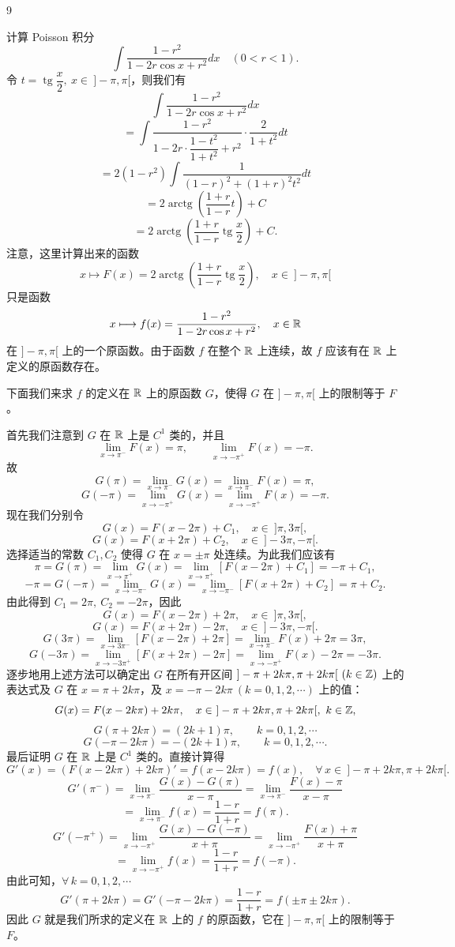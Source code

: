 \begin{sourceexample}{9}

	计算 Poisson 积分
	\[
	\int\frac{1-r^2}{1-2r\cos x+r^2}dx\quad(0<r<1).
	\]
	令 \(t=\operatorname{tg}\dfrac x2,\ x\in\ ]-\pi,\pi[\)，则我们有
	\[
	\int\frac{1-r^2}{1-2r\cos x+r^2}dx
	\]
	\[
	=\int\frac{1-r^2}{1-2r\cdot\dfrac{1-t^2}{1+t^2}+r^2}\cdot\frac2{1+t^2}dt
	\]
	\[
	=2(1-r^2)\int\frac1{(1-r)^2+(1+r)^2t^2}dt
	\]
	\[
	=2\operatorname{arctg}\left(\frac{1+r}{1-r}t\right)+C
	\]
	\[
	=2\operatorname{arctg}\left(\frac{1+r}{1-r}\operatorname{tg}\frac x2\right)+C.
	\]
	注意，这里计算出来的函数
	\[
	x\longmapsto F(x)=2\operatorname{arctg}\left(\frac{1+r}{1-r}\operatorname{tg}\frac x2\right),\quad x\in\ ]-\pi,\pi[
	\]
	只是函数
	\[
	x\longmapsto f(x)=\frac{1-r^2}{1-2r\cos x+r^2},\quad x\in\mathbb{R}
	\]
	在 \(]-\pi,\pi[\) 上的一个原函数。由于函数 \(f\) 在整个 \(\mathbb{R}\) 上连续，故 \(f\) 应该有在 \(\mathbb{R}\) 上定义的原函数存在。

	下面我们来求 \(f\) 的定义在 \(\mathbb{R}\) 上的原函数 \(G\)，使得 \(G\) 在 \(]-\pi,\pi[\) 上的限制等于 \(F\)。

	首先我们注意到 \(G\) 在 \(\mathbb{R}\) 上是 \(C^1\) 类的，并且
	\[
	\lim_{x\to\pi^-}F(x)=\pi,\qquad\lim_{x\to-\pi^+}F(x)=-\pi.
	\]
	故
	\[
	G(\pi)=\lim_{x\to\pi^-}G(x)=\lim_{x\to\pi^-}F(x)=\pi,
	\]
	\[
	G(-\pi)=\lim_{x\to-\pi^+}G(x)=\lim_{x\to-\pi^+}F(x)=-\pi.
	\]
	现在我们分别令
	\[
	G(x)=F(x-2\pi)+C_1,\quad x\in\ ]\pi,3\pi[,
	\]
	\[
	G(x)=F(x+2\pi)+C_2,\quad x\in\ ]-3\pi,-\pi[.
	\]
	选择适当的常数 \(C_1,C_2\) 使得 \(G\) 在 \(x=\pm\pi\) 处连续。为此我们应该有
	\[
	\pi=G(\pi)=\lim_{x\to\pi^+}G(x)=\lim_{x\to\pi^+}[F(x-2\pi)+C_1]=-\pi+C_1,
	\]
	\[
	-\pi=G(-\pi)=\lim_{x\to-\pi^-}G(x)=\lim_{x\to-\pi^-}[F(x+2\pi)+C_2]=\pi+C_2.
	\]
	由此得到 \(C_1=2\pi,\ C_2=-2\pi\)，因此
	\[
	G(x)=F(x-2\pi)+2\pi,\quad x\in\ ]\pi,3\pi[,
	\]
	\[
	G(x)=F(x+2\pi)-2\pi,\quad x\in\ ]-3\pi,-\pi[.
	\]
	\[
	G(3\pi)=\lim_{x\to3\pi^-}[F(x-2\pi)+2\pi]=\lim_{x\to\pi^-}F(x)+2\pi=3\pi,
	\]
	\[
	G(-3\pi)=\lim_{x\to-3\pi^+}[F(x+2\pi)-2\pi]=\lim_{x\to-\pi^+}F(x)-2\pi=-3\pi.
	\]
	逐步地用上述方法可以确定出 \(G\) 在所有开区间 \(]-\pi+2k\pi,\pi+2k\pi[\ (k\in\Z)\) 上的表达式及 \(G\) 在 \(x=\pi+2k\pi\)，及 \(x=-\pi-2k\pi\ (k=0,1,2,\cdots)\) 上的值：
	\[
	G(x)=F(x-2k\pi)+2k\pi,\quad x\in\ ]-\pi+2k\pi,\pi+2k\pi[,\ k\in\Z,
	\]
	\[
	G(\pi+2k\pi)=(2k+1)\pi,\qquad k=0,1,2,\cdots
	\]
	\[
	G(-\pi-2k\pi)=-(2k+1)\pi,\qquad k=0,1,2,\cdots.
	\]
	最后证明 \(G\) 在 \(\mathbb{R}\) 上是 \(C^1\) 类的。直接计算得
	\[
	G'(x)=(F(x-2k\pi)+2k\pi)'=f(x-2k\pi)=f(x),\quad\forall\,x\in\ ]-\pi+2k\pi,\pi+2k\pi[.
	\]
	\[
	G'(\pi^-)=\lim_{x\to\pi^-}\frac{G(x)-G(\pi)}{x-\pi}=\lim_{x\to\pi^-}\frac{F(x)-\pi}{x-\pi}
	\]
	\[
	=\lim_{x\to\pi^-}f(x)=\frac{1-r}{1+r}=f(\pi).
	\]
	\[
	G'(-\pi^+)=\lim_{x\to-\pi^+}\frac{G(x)-G(-\pi)}{x+\pi}=\lim_{x\to-\pi^+}\frac{F(x)+\pi}{x+\pi}
	\]
	\[
	=\lim_{x\to-\pi^+}f(x)=\frac{1-r}{1+r}=f(-\pi).
	\]
	由此可知，\(\forall\,k=0,1,2,\cdots\)
	\[
	G'(\pi+2k\pi)=G'(-\pi-2k\pi)=\frac{1-r}{1+r}=f(\pm\pi\pm2k\pi).
	\]
	因此 \(G\) 就是我们所求的定义在 \(\mathbb{R}\) 上的 \(f\) 的原函数，它在 \(]-\pi,\pi[\) 上的限制等于 \(F\)。


\end{sourceexample}
